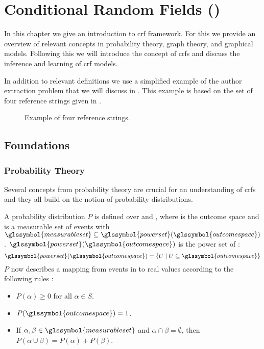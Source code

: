 \chapter{Conditional Random Fields ()}\label{cha:crfs}

In this chapter we give an introduction to \acrfull{crf} framework.
For this we provide an overview of relevant concepts in probability theory, graph theory, and graphical models.
Following this we will introduce the concept of \glspl{crf} and discuss the inference and learning of \gls{crf} models.

In addition to relevant definitions we use a simplified example of the author extraction problem that we will discuss in .
This example is based on the set of four reference strings given in .

\begin{figure}[t]
\begin{framed}
  
\end{framed}
\caption{Example of four reference strings.}
\label{fig:example-reference-strings}
\end{figure}
\section{Foundations}\label{sec:foundations}
\subsection{Probability Theory}\label{subsec:probability-theory}
Several concepts from probability theory are crucial for an understanding of \glspl{crf} and they all build on the notion of \glspl{probability distribution}.

A \gls{probability distribution} $P$ is defined over  and , where  is the \gls{outcome space} and  is a \gls{measurable set} of \glspl{event} with $\glssymbol{measurable set}\subseteq \glssymbol{power set} (\glssymbol{outcome space})$ \citep{koller2009probabilistic}.
$\glssymbol{power set}(\glssymbol{outcome space})$ is the \gls{power set} of :
\begin{equation}
  \label{equ:power-set}
  \glssymbol{power set}(\glssymbol{outcome space})=\left\{U\mid U\subseteq \glssymbol{outcome space}\right\}
\end{equation}
$P$ now describes a mapping from events in  to real values according to the following rules \citep{koller2009probabilistic}:
\begin{itemize}
  \item $P(\alpha)\geq 0 $ for all $ \alpha \in S$.
  \item $P(\glssymbol{outcome space})=1$.
  \item If $\alpha,\beta\in \glssymbol{measurable set}$ and $\alpha\cap\beta = \emptyset$, then $P(\alpha\cup\beta)=P(\alpha)+P(\beta)$.
\end{itemize}

